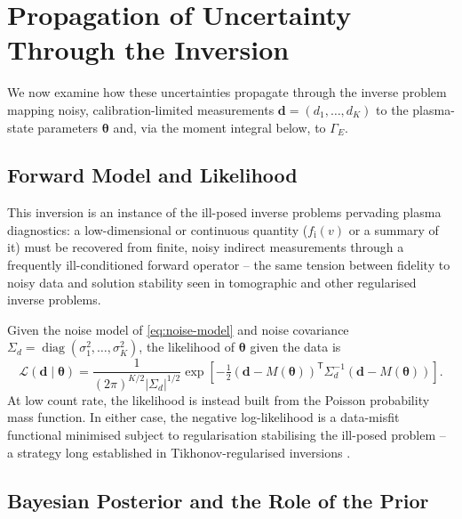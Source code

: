 \section{Propagation of Uncertainty Through the Inversion}
\label{sec:propagation}

We now examine how these uncertainties propagate through the inverse problem mapping noisy, calibration-limited measurements $\mathbf{d} = (d_{1}, \dots, d_{K})$ to the plasma-state parameters $\boldsymbol{\theta}$ and, via the moment integral below, to $\Gamma_{E}$.

\subsection{Forward Model and Likelihood}
\label{subsec:likelihood}

This inversion is an instance of the ill-posed inverse problems pervading plasma diagnostics: a low-dimensional or continuous quantity ($f_{\mathrm{i}}(v)$ or a summary of it) must be recovered from finite, noisy indirect measurements through a frequently ill-conditioned forward operator -- the same tension between fidelity to noisy data and solution stability seen in tomographic and other regularised inverse problems.

Given the noise model of \cref{eq:noise-model} and noise covariance $\Sigma_{d} = \operatorname{diag}(\sigma_{1}^{2}, \dots, \sigma_{K}^{2})$, the likelihood of $\boldsymbol{\theta}$ given the data is
\begin{equation}
\mathcal{L}(\mathbf{d} \mid \boldsymbol{\theta}) = \frac{1}{(2\pi)^{K/2} |\Sigma_{d}|^{1/2}} \exp\!\left[-\tfrac{1}{2} \left(\mathbf{d} - M(\boldsymbol{\theta})\right)^{\mathsf{T}} \Sigma_{d}^{-1} \left(\mathbf{d} - M(\boldsymbol{\theta})\right)\right].
\label{eq:gaussian-likelihood}
\end{equation}
At low count rate, the likelihood is instead built from the Poisson probability mass function. In either case, the negative log-likelihood is a data-misfit functional minimised subject to regularisation stabilising the ill-posed problem -- a strategy long established in Tikhonov-regularised inversions \cite{ref0677,ref0692}.

\subsection{Bayesian Posterior and the Role of the Prior}
\label{subsec:bayesian-posterior}

